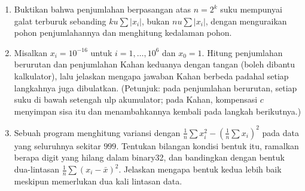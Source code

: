 \begin{latihan}
\begin{enumerate}
  \item Buktikan bahwa penjumlahan berpasangan atas $n=2^{k}$ suku mempunyai galat
        terburuk sebanding $ku\sum|x_{i}|$, bukan $nu\sum|x_{i}|$, dengan menguraikan
        pohon penjumlahannya dan menghitung kedalaman pohon.

  \item Misalkan $x_{i}=10^{-16}$ untuk $i=1,\dots,10^{6}$ dan $x_{0}=1$. Hitung
        penjumlahan berurutan dan penjumlahan Kahan keduanya dengan tangan (boleh
        dibantu kalkulator), lalu jelaskan mengapa jawaban Kahan berbeda padahal
        setiap langkahnya juga dibulatkan.
        (Petunjuk: pada penjumlahan berurutan, setiap suku di bawah setengah ulp
        akumulator; pada Kahan, kompensasi $c$ menyimpan sisa itu dan menambahkannya
        kembali pada langkah berikutnya.)

  \item Sebuah program menghitung variansi dengan
        $\frac1n\sum x_{i}^{2}-\left(\frac1n\sum x_{i}\right)^{2}$ pada data yang
        seluruhnya sekitar $999$. Tentukan bilangan kondisi bentuk itu, ramalkan
        berapa digit yang hilang dalam binary32, dan bandingkan dengan bentuk
        dua-lintasan $\frac1n\sum(x_{i}-\bar{x})^{2}$. Jelaskan mengapa bentuk kedua
        lebih baik meskipun memerlukan dua kali lintasan data.
\end{enumerate}
\end{latihan}

